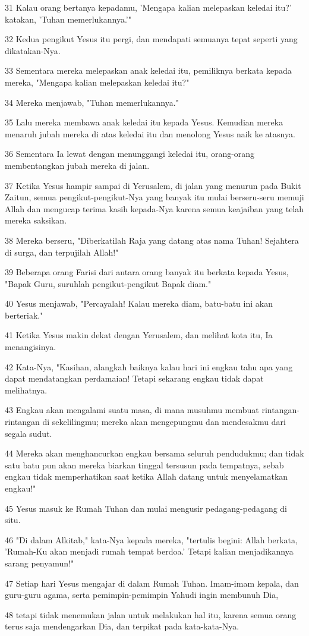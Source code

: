 \par 31 Kalau orang bertanya kepadamu, 'Mengapa kalian melepaskan keledai itu?' katakan, 'Tuhan memerlukannya.'"
\par 32 Kedua pengikut Yesus itu pergi, dan mendapati semuanya tepat seperti yang dikatakan-Nya.
\par 33 Sementara mereka melepaskan anak keledai itu, pemiliknya berkata kepada mereka, "Mengapa kalian melepaskan keledai itu?"
\par 34 Mereka menjawab, "Tuhan memerlukannya."
\par 35 Lalu mereka membawa anak keledai itu kepada Yesus. Kemudian mereka menaruh jubah mereka di atas keledai itu dan menolong Yesus naik ke atasnya.
\par 36 Sementara Ia lewat dengan menunggangi keledai itu, orang-orang membentangkan jubah mereka di jalan.
\par 37 Ketika Yesus hampir sampai di Yerusalem, di jalan yang menurun pada Bukit Zaitun, semua pengikut-pengikut-Nya yang banyak itu mulai berseru-seru memuji Allah dan mengucap terima kasih kepada-Nya karena semua keajaiban yang telah mereka saksikan.
\par 38 Mereka berseru, "Diberkatilah Raja yang datang atas nama Tuhan! Sejahtera di surga, dan terpujilah Allah!"
\par 39 Beberapa orang Farisi dari antara orang banyak itu berkata kepada Yesus, "Bapak Guru, suruhlah pengikut-pengikut Bapak diam."
\par 40 Yesus menjawab, "Percayalah! Kalau mereka diam, batu-batu ini akan berteriak."
\par 41 Ketika Yesus makin dekat dengan Yerusalem, dan melihat kota itu, Ia menangisinya.
\par 42 Kata-Nya, "Kasihan, alangkah baiknya kalau hari ini engkau tahu apa yang dapat mendatangkan perdamaian! Tetapi sekarang engkau tidak dapat melihatnya.
\par 43 Engkau akan mengalami suatu masa, di mana musuhmu membuat rintangan-rintangan di sekelilingmu; mereka akan mengepungmu dan mendesakmu dari segala sudut.
\par 44 Mereka akan menghancurkan engkau bersama seluruh pendudukmu; dan tidak satu batu pun akan mereka biarkan tinggal tersusun pada tempatnya, sebab engkau tidak memperhatikan saat ketika Allah datang untuk menyelamatkan engkau!"
\par 45 Yesus masuk ke Rumah Tuhan dan mulai mengusir pedagang-pedagang di situ.
\par 46 "Di dalam Alkitab," kata-Nya kepada mereka, "tertulis begini: Allah berkata, 'Rumah-Ku akan menjadi rumah tempat berdoa.' Tetapi kalian menjadikannya sarang penyamun!"
\par 47 Setiap hari Yesus mengajar di dalam Rumah Tuhan. Imam-imam kepala, dan guru-guru agama, serta pemimpin-pemimpin Yahudi ingin membunuh Dia,
\par 48 tetapi tidak menemukan jalan untuk melakukan hal itu, karena semua orang terus saja mendengarkan Dia, dan terpikat pada kata-kata-Nya.

